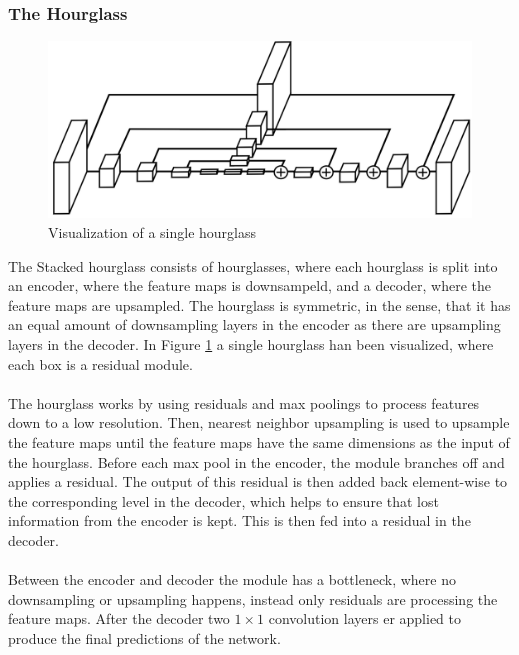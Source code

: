 \documentclass[./main.tex]{subfiles}
\begin{document}
\subsubsection{The Hourglass}
\begin{figure}[htbp]
    \centering
    \includegraphics[height = 4 cm]{entities/Hourglass.png}
    \caption{Visualization of a single hourglass \cite{Newell}}
    \label{fig:hourglass}
\end{figure}
\noindent The Stacked hourglass consists of hourglasses, where each hourglass is split into an encoder, where the feature maps is downsampeld, and a decoder, where the feature maps are upsampled. The hourglass is symmetric, in the sense, that it has an equal amount of downsampling layers in the encoder as there are upsampling layers in the decoder. In Figure \ref{fig:hourglass} a single hourglass han been visualized, where each box is a residual module.
\\
\\
The hourglass works by using residuals and max poolings to process features down to a low resolution. Then, nearest neighbor upsampling is used to upsample the feature maps until the feature maps have the same dimensions as the input of the hourglass. Before each max pool in the encoder, the module branches off and applies a residual. The output of this residual is then added back element-wise to the corresponding level in the decoder, which helps to ensure that lost information from the encoder is kept. This is then fed into a residual in the decoder.
\\
\\
Between the encoder and decoder the module has a bottleneck, where no downsampling or upsampling happens, instead only residuals are processing the feature maps. After the decoder two $1 \times 1$ convolution layers er applied to produce the final predictions of the network.
\end{document}
